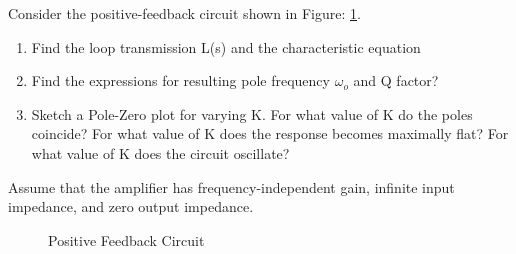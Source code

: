 Consider the positive-feedback circuit shown in Figure: \ref{fig:ee18btech11030}. 
\begin{enumerate}
\item Find the loop transmission L(s) and the characteristic equation
\item Find the expressions for resulting pole frequency $\omega_o$ and Q factor?
\item Sketch a Pole-Zero plot for varying K. For what value of K do the poles coincide? For what value of K does the response becomes maximally flat? For what value of K does the circuit oscillate?
\end{enumerate}
 Assume that the amplifier has frequency-independent gain, infinite input impedance, and zero output impedance.
\begin{figure}[!ht]
	\begin{center}
		\resizebox{\columnwidth/1}{!}{}
	\end{center}
	\caption{ Positive Feedback Circuit}
	\label{fig:ee18btech11030}
\end{figure}

